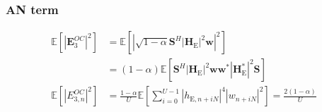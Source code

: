 \documentclass[journal,comsoc]{IEEEtran}
\newcommand{\module}[1]{\left|#1\right|}
\newcommand{\EX}[1]{\mathbb{E} \left[#1\right]}%
\newcommand{\HE}{\textbf{H}_{\text{E}}}
\newcommand{\spread}{\textbf{S}}
\newcommand{\w}{\textbf{w}}
\begin{document}
\subsubsection{AN term}\label{sec:an-term-app-3}
\begin{equation}
	\begin{split}
		\EX{|\textbf{E}_{3}^{OC}|^2} &=  \EX{\module{\sqrt{1-\alpha}\spread^H \left|\HE\right|^2 \w}^2} \\
		&=(1-\alpha)\EX{\spread^H \left|\HE\right|^2 \w\w^* \left|\HE^*\right|^2\spread } \\
		\EX{|E_{3,n}^{OC}|^2}  &= \frac{1-\alpha}{U} \EX{\sum_{i=0}^{U-1} |h_{\text{E}, n + iN}|^4 |w_{n + iN}|^2} = \frac{2(1-\alpha)}{U}
	\end{split}
	\label{eq:an_eve_filt5-app}
\end{equation}




 





\end{document}
